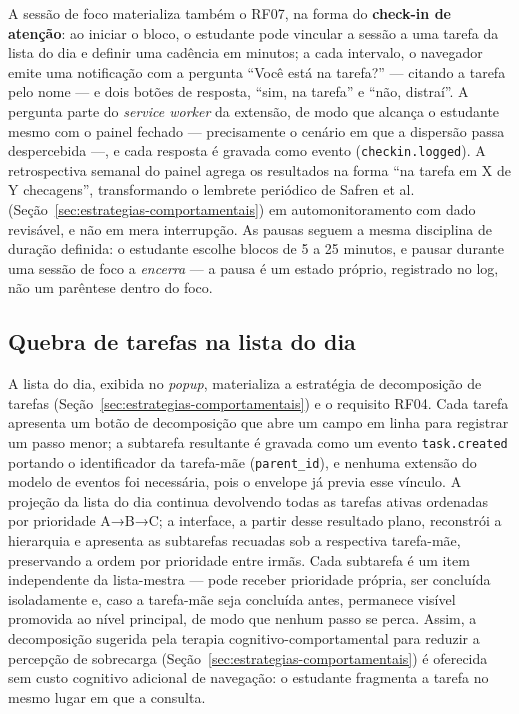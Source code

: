 \documentclass[12pt, %
openright, 
oneside,
a4paper,
english,   %
brazil]{facom-ufu-abntex2}
\begin{document}
A sessão de foco materializa também o RF07, na forma do \textbf{check-in de atenção}: ao iniciar o bloco, o estudante pode vincular a sessão a uma tarefa da lista do dia e definir uma cadência em minutos; a cada intervalo, o navegador emite uma notificação com a pergunta ``Você está na tarefa?'' --- citando a tarefa pelo nome --- e dois botões de resposta, ``sim, na tarefa'' e ``não, distraí''. A pergunta parte do \textit{service worker} da extensão, de modo que alcança o estudante mesmo com o painel fechado --- precisamente o cenário em que a dispersão passa despercebida ---, e cada resposta é gravada como evento (\texttt{checkin.logged}). A retrospectiva semanal do painel agrega os resultados na forma ``na tarefa em X de Y checagens'', transformando o lembrete periódico de Safren et al. (Seção~\ref{sec:estrategias-comportamentais}) em automonitoramento com dado revisável, e não em mera interrupção. As pausas seguem a mesma disciplina de duração definida: o estudante escolhe blocos de 5 a 25 minutos, e pausar durante uma sessão de foco a \emph{encerra} --- a pausa é um estado próprio, registrado no log, não um parêntese dentro do foco.

\subsection{Quebra de tarefas na lista do dia}
\label{sub:quebra-tarefas}
A lista do dia, exibida no \textit{popup}, materializa a estratégia de decomposição de tarefas (Seção~\ref{sec:estrategias-comportamentais}) e o requisito RF04. Cada tarefa apresenta um botão de decomposição que abre um campo em linha para registrar um passo menor; a subtarefa resultante é gravada como um evento \texttt{task.created} portando o identificador da tarefa-mãe (\texttt{parent\_id}), e nenhuma extensão do modelo de eventos foi necessária, pois o envelope já previa esse vínculo. A projeção da lista do dia continua devolvendo todas as tarefas ativas ordenadas por prioridade A→B→C; a interface, a partir desse resultado plano, reconstrói a hierarquia e apresenta as subtarefas recuadas sob a respectiva tarefa-mãe, preservando a ordem por prioridade entre irmãs. Cada subtarefa é um item independente da lista-mestra --- pode receber prioridade própria, ser concluída isoladamente e, caso a tarefa-mãe seja concluída antes, permanece visível promovida ao nível principal, de modo que nenhum passo se perca. Assim, a decomposição sugerida pela terapia cognitivo-comportamental para reduzir a percepção de sobrecarga (Seção~\ref{sec:estrategias-comportamentais}) é oferecida sem custo cognitivo adicional de navegação: o estudante fragmenta a tarefa no mesmo lugar em que a consulta.
\end{document}
